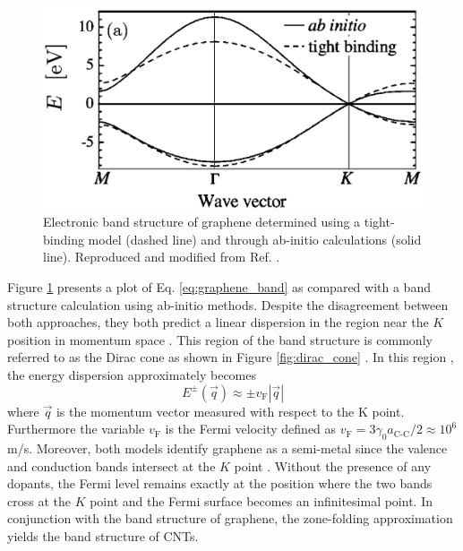 \begin{figure}[h]
	\centering
	\includegraphics[scale=0.5]{images/chapter_optical_props/graphene_band_charlier}
	\caption{Electronic band structure of graphene determined using a tight-binding model (dashed line) and through ab-initio calculations (solid line). Reproduced and modified from Ref. \cite{reich2002tight}.}
	\label{fig:graphene_band}
\end{figure}
%
Figure \ref{fig:graphene_band} presents a plot of Eq. \ref{eq:graphene_band} as compared with a band structure calculation using ab-initio methods. Despite the disagreement between both approaches, they both predict a linear dispersion in the region near the $K$ position in momentum space \cite{charlier2007electronic}. This region of the band structure is commonly referred to as the Dirac cone	as shown in Figure \ref{fig:dirac_cone} \cite{charlier2007electronic}. In this region , the energy dispersion approximately becomes
\begin{equation}
	\displaystyle E^{\pm}(\vec{q}) \approx \pm v_\text{F}|\vec{q}|
\end{equation}
where $\vec{q}$ is the momentum vector measured with respect to the K point. Furthermore the variable $v_\text{F}$ is the Fermi velocity defined as $v_\text{F} = 3 \gamma_0 a_\text{C-C}/2 \approx 10^6$ m/s. Moreover, both models identify graphene as a semi-metal since the valence and conduction bands intersect at the $K$ point \cite{charlier2007electronic}. Without the presence of any dopants, the Fermi level remains exactly at the position where the two bands cross at the $K$ point and the Fermi surface becomes an infinitesimal point. In conjunction with the band structure of graphene, the zone-folding approximation yields the band structure of CNTs.

